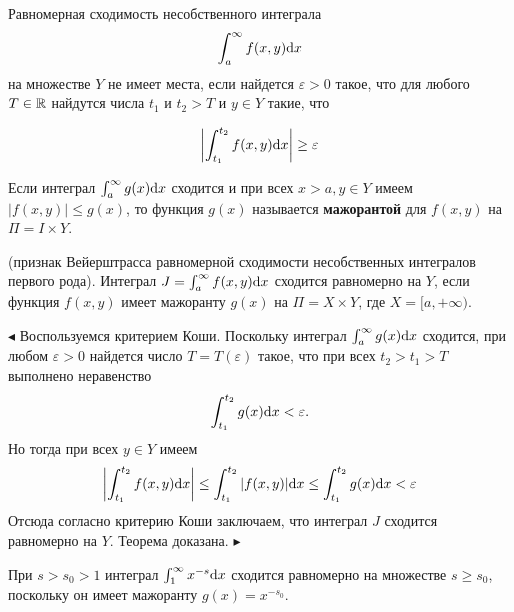 \begin{theorem}
Равномерная сходимость несобственного интеграла
$$\int_a^\infty {f(x,y){\rm d}x}$$
на множестве $Y$ не имеет места, если найдется $\varepsilon >0$ такое, что для любого $T\in \mathbb R$ найдутся числа $t_1$ и $t_2>T$ и $y\in Y$ такие, что

$$\left|\int_{t_1}^{t_2} {f(x,y){\rm d}x}\right|\ge \varepsilon$$ 
\end{theorem}
\begin{object}
Если интеграл $\int_a^\infty {g(x){\rm d}x}$ сходится и при всех $x>a, y\in Y$ имеем $|f(x,y)|\le g(x)$, то функция $g(x)$ называется \textbf{мажорантой} для $f(x,y)$ на $\Pi =I\times Y$.
\end{object}
\begin{theorem}
(признак Вейерштрасса равномерной сходимости несобственных интегралов первого рода). Интеграл $J=\int_a^\infty {f(x,y){\rm d}x}$ сходится равномерно на $Y$, если функция $f(x,y)$ имеет мажоранту $g(x)$ на $\Pi=X\times Y$, где $X=[a,+\infty)$.
\end{theorem}
$\blacktriangleleft$
Воспользуемся критерием Коши. Поскольку интеграл $\int_a^\infty {g(x){\rm d}x}$ сходится, при любом $\varepsilon >0$ найдется число $T=T(\varepsilon)$ такое, что при всех $t_2>t_1>T$ выполнено неравенство
$$\int_{t_1}^{t_2} {g(x){\rm d}x}<\varepsilon.$$
Но тогда при всех $y\in Y$ имеем
$$\left|\int_{t_1}^{t_2}{f(x,y){\rm d}x}\right|\le \int_{t_1}^{t_2}{|f(x,y)|{\rm d}x}\le \int_{t_1}^{t_2}{g(x){\rm d}x}<\varepsilon$$
Отсюда согласно критерию Коши заключаем, что интеграл $J$ сходится равномерно на $Y$. Теорема доказана. 
$\blacktriangleright$
\begin{example} 
При $s>s_0>1$ интеграл $\int_1^\infty{x^{-s}{\rm d}x}$ сходится равномерно на множестве $s\ge s_0$, поскольку он имеет мажоранту $g(x)=x^{-s_0}$.
\end{example}

